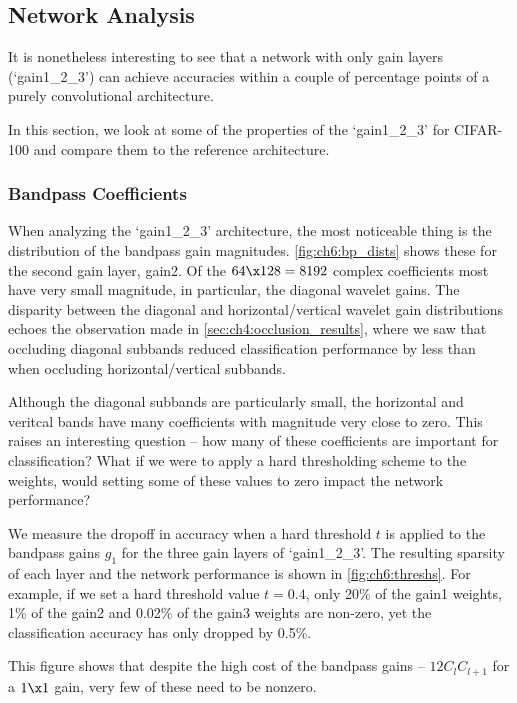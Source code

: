\subsection{Network Analysis}
It is nonetheless interesting to see that a network with only gain layers
(`gain1\_2\_3') can achieve accuracies within a couple of percentage points of a
purely convolutional architecture.

In this section, we look at some of the properties of the `gain1\_2\_3' for
CIFAR-100 and compare them to the reference architecture.

\subsubsection{Bandpass Coefficients}
When analyzing the `gain1\_2\_3' architecture, the most noticeable thing is the
distribution of the bandpass gain magnitudes. \autoref{fig:ch6:bp_dists} shows
these for the second gain layer, gain2. Of the $64\x 128=8192$ complex
coefficients most have very small magnitude, in particular, the diagonal wavelet
gains. The disparity between the diagonal and horizontal/vertical wavelet gain
distributions echoes the observation made in
\autoref{sec:ch4:occlusion_results}, where we saw that occluding diagonal
subbands reduced classification performance by less than when occluding
horizontal/vertical subbands.

Although the diagonal subbands are particularly small, the horizontal and
veritcal bands have many coefficients with magnitude very close to zero.
This raises an interesting question -- how many of these coefficients are
important for classification? What if we were to apply a hard thresholding
scheme to the weights, would setting some of these values to zero impact the
network performance?

We measure the dropoff in accuracy when a hard threshold $t$ is applied to the
bandpass gains $g_1$ for the three gain layers of `gain1\_2\_3'. The resulting sparsity
of each layer and the network performance is shown in \autoref{fig:ch6:threshs}.
For example, if we set a hard threshold value $t=0.4$, only 20\% of the gain1
weights, 1\% of the gain2 and 0.02\% of the gain3 weights are non-zero, yet the
classification accuracy has only dropped by 0.5\%.

This figure shows that despite the high cost of the bandpass gains --
$12C_{l}C_{l+1}$ for a $1\x1$ gain, very few of these need to be nonzero.

